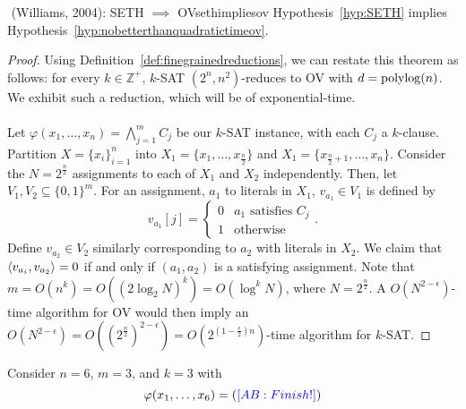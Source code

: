         \pagebreak
        \begin{theorem}{\Stop\,\,(Williams, 2004): SETH \(\implies\) OV}{sethimpliesov}
            Hypothesis~\ref{hyp:SETH} implies Hypothesis~\ref{hyp:nobetterthanquadratictimeov}.
            \begin{proof}
                Using Definition~\ref{def:finegrainedreductions}, we can restate this theorem as follows: for every \(k\in\mathbb{Z}^+\), \(k\)-\textsc{SAT} \((2^n,n^2)\)-reduces to \textsc{OV} with \(d=\operatorname{polylog}(n)\). We exhibit such a reduction, which will be of exponential-time.
                \\
                \\
                Let \(\varphi(x_1,\ldots,x_n)=\bigwedge_{j=1}^m C_j\) be our \(k\)-\textsc{SAT} instance, with each \(C_j\) a \(k\)-clause. Partition \(X=\{x_i\}_{i=1}^n\) into \(X_1=\{x_1,\ldots,x_{\frac{n}{2}}\}\) and \(X_1=\{x_{\frac{n}{2}+1},\ldots,x_n\}\). Consider the \(N=2^\frac{n}{2}\) assignments to each of \(X_1\) and \(X_2\) independently. Then, let \(V_1,V_2\subseteq\{0,1\}^m\). For an assignment, \(a_1\) to literals in \(X_1\), \(v_{a_1}\in V_1\) is defined by
                \begin{equation*}
                    v_{a_1}[j]=\begin{cases}
                    0 & a_1\text{ satisfies }C_j \\
                    1 & \text{otherwise}
                    \end{cases}.
                \end{equation*}
                Define \(v_{a_2}\in V_2\) similarly corresponding to \(a_2\) with literals in \(X_2\). We claim that \(\left\langle v_{a_i},v_{a_2}\right\rangle=0\) if and only if \((a_1,a_2)\) is a satisfying assignment. Note that \(m=O(n^k)=O((2\log_2N)^k)=O(\log^kN)\), where \(N=2^\frac{n}{2}\). A \(O\left(N^{2-\epsilon}\right)\)-time algorithm for \textsc{OV} would then imply an \(O\left(N^{2-\epsilon}\right)=O\left(\left(2^\frac{n}{2}\right)^{2-\epsilon}\right)=O\left(2^{\left(1-\frac{\epsilon}{2}\right)n}\right)\)-time algorithm for \(k\)-\textsc{SAT}. 
            \end{proof}
        \end{theorem}
        \begin{example}
            Consider \(n=6\), \(m=3\), and \(k=3\) with
            \begin{equation*}
                \varphi(x_1,\ldots,x_6)=(\adit{Finish!})
            \end{equation*}
        \end{example}

